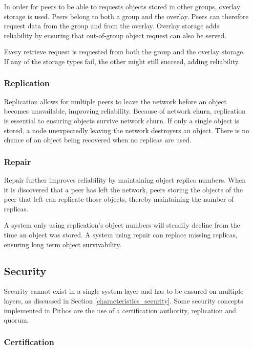 In order for peers to be able to requests objects stored in other groups, overlay storage is used. Peers belong to both a group and the overlay. Peers can therefore request data from the group and from the overlay. Overlay storage adds reliability by ensuring that out-of-group object request can also be served.

Every retrieve request is requested from both the group and the overlay storage. If any of the storage types fail, the other might still succeed, adding reliability.

\subsubsection{Replication}

Replication allows for multiple peers to leave the network before an object becomes unavailable, improving reliability. Because of network churn, replication is essential to ensuring objects survive network churn. If only a single object is stored, a node unexpectedly leaving the network destroyers an object. There is no chance of an object being recovered when no replicas are used.

\subsubsection{Repair}

Repair further improves reliability by maintaining object replica numbers. When it is discovered that a peer has left the network, peers storing the objects of the peer that left can replicate those objects, thereby maintaining the number of replicas.

A system only using replication's object numbers will steadily decline from the time an object was stored. A system using repair can replace missing replicas, ensuring long term object survivability.

\subsection{Security}

Security cannot exist in a single system layer and has to be ensured on multiple layers, as discussed in Section \ref{characteristics_security}. Some security concepts implemented in Pithos are the use of a certification authority, replication and quorum.

\subsubsection{Certification}

